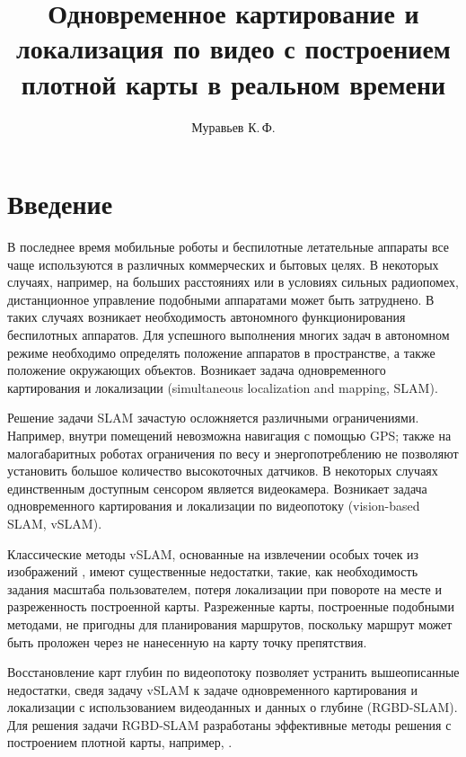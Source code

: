 \documentclass{mipt-thesis-ms}
\title{Одновременное картирование и локализация по видео с построением плотной карты в реальном времени}
\author{Муравьев К.\,Ф.}
\begin{document}
	\titlecontents
	
	
	\chapter{Введение}
	
	В последнее время мобильные роботы и беспилотные летательные аппараты все чаще используются в различных коммерческих и бытовых целях. В некоторых случаях, например, на больших расстояниях или в условиях сильных радиопомех, дистанционное управление подобными аппаратами может быть затруднено. В таких случаях возникает необходимость автономного функционирования беспилотных аппаратов. Для успешного выполнения многих задач в автономном режиме необходимо определять положение аппаратов в пространстве, а также положение окружающих объектов. Возникает задача одновременного картирования и локализации (simultaneous localization and mapping, SLAM).
	
	Решение задачи SLAM зачастую осложняется различными ограничениями. Например, внутри помещений невозможна навигация с помощью GPS; также на малогабаритных роботах ограничения по весу и энергопотреблению не позволяют установить большое количество высокоточных датчиков. В некоторых случаях единственным доступным сенсором является видеокамера. Возникает задача одновременного картирования и локализации по видеопотоку (vision-based SLAM, vSLAM).
	
	Классические методы vSLAM, основанные на извлечении особых точек из изображений \cite{mur2015orb}\cite{klein2007parallel}, имеют существенные недостатки, такие, как необходимость задания масштаба пользователем, потеря локализации при повороте на месте и разреженность построенной карты. Разреженные карты, построенные подобными методами, не пригодны для планирования маршрутов, поскольку маршрут может быть проложен через не нанесенную на карту точку препятствия.
	
	Восстановление карт глубин по видеопотоку позволяет устранить вышеописанные недостатки, сведя задачу vSLAM к задаче одновременного картирования и локализации с использованием видеоданных и данных о глубине (RGBD-SLAM). Для решения задачи RGBD-SLAM разработаны эффективные методы решения с построением плотной карты, например, \cite{endres20133}\cite{labbe2019rtab}.
	
\end{document}
